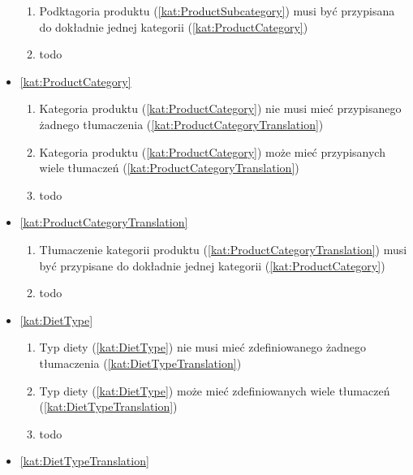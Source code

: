 \begin{itemize}[label={\textbf{Reguły dla}}, wide, labelwidth=!, labelindent=0pt]
\begin{enumerate}[label={\textbf{REG/\protect\threedigits{\arabic{enumi}}}}, wide, labelwidth=!, align=left, leftmargin=3cm, resume]
        \item Podktagoria produktu (\ref{kat:ProductSubcategory}) musi być przypisana do dokładnie jednej kategorii (\ref{kat:ProductCategory})
        \item todo
    \end{enumerate}
    \item\ref{kat:ProductCategory}
    \begin{enumerate}[label={\textbf{REG/\protect\threedigits{\arabic{enumi}}}}, wide, labelwidth=!, align=left, leftmargin=3cm, resume]
        \item Kategoria produktu (\ref{kat:ProductCategory}) nie musi mieć przypisanego żadnego tłumaczenia (\ref{kat:ProductCategoryTranslation})
        \item Kategoria produktu (\ref{kat:ProductCategory}) może mieć przypisanych wiele tłumaczeń (\ref{kat:ProductCategoryTranslation})
        \item todo
    \end{enumerate}
    \item\ref{kat:ProductCategoryTranslation}
    \begin{enumerate}[label={\textbf{REG/\protect\threedigits{\arabic{enumi}}}}, wide, labelwidth=!, align=left, leftmargin=3cm, resume]
        \item Tłumaczenie kategorii produktu (\ref{kat:ProductCategoryTranslation}) musi być przypisane do dokładnie jednej kategorii (\ref{kat:ProductCategory})
        \item todo
    \end{enumerate}
    \item\ref{kat:DietType}
    \begin{enumerate}[label={\textbf{REG/\protect\threedigits{\arabic{enumi}}}}, wide, labelwidth=!, align=left, leftmargin=3cm, resume]
        \item Typ diety (\ref{kat:DietType}) nie musi mieć zdefiniowanego żadnego tłumaczenia (\ref{kat:DietTypeTranslation})
        \item Typ diety (\ref{kat:DietType}) może mieć zdefiniowanych wiele tłumaczeń (\ref{kat:DietTypeTranslation})
        \item todo
    \end{enumerate}
    \item\ref{kat:DietTypeTranslation}
    \begin{enumerate}[label={\textbf{REG/\protect\threedigits{\arabic{enumi}}}}, wide, labelwidth=!, align=left, leftmargin=3cm, resume]

\end{enumerate}
\end{itemize}
